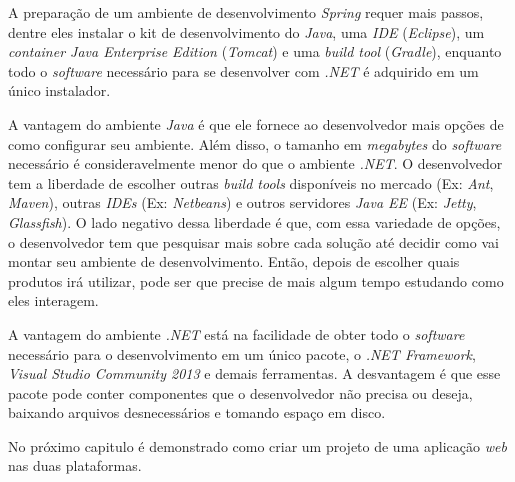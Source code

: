 A preparação de um ambiente de desenvolvimento \textit{Spring} requer mais passos, dentre eles instalar o kit de desenvolvimento do \textit{Java}, uma \textit{IDE} (\textit{Eclipse}), um \textit{container Java Enterprise Edition} (\textit{Tomcat}) e uma \textit{build tool} (\textit{Gradle}), enquanto  todo o \textit{software} necessário para se desenvolver com \textit{.NET} é adquirido em um único instalador.

A vantagem do ambiente \textit{Java} é que ele fornece ao desenvolvedor mais opções de como configurar seu ambiente. Além disso, o tamanho em \textit{megabytes} do \textit{software} necessário é consideravelmente menor do que o ambiente \textit{.NET}. O desenvolvedor tem a liberdade de escolher outras \textit{build tools} disponíveis no mercado (Ex: \textit{Ant}, \textit{Maven}), outras \textit{IDEs} (Ex: \textit{Netbeans}) e outros servidores \textit{Java EE} (Ex: \textit{Jetty}, \textit{Glassfish}). O lado negativo dessa liberdade é que, com  essa variedade de opções, o desenvolvedor tem que pesquisar mais sobre cada solução até decidir como vai montar seu ambiente de desenvolvimento. Então, depois de escolher quais produtos irá utilizar, pode ser que precise de mais algum tempo estudando como eles interagem.

A vantagem do ambiente \textit{.NET} está na facilidade de obter todo o \textit{software} necessário para o desenvolvimento em um único pacote, o \textit{.NET Framework}, \textit{Visual Studio Community 2013} e demais ferramentas. A desvantagem é que esse pacote pode conter componentes que o desenvolvedor não precisa ou deseja, baixando arquivos desnecessários e tomando espaço em disco.

No próximo capitulo é demonstrado como criar um projeto de uma aplicação \textit{web} nas duas plataformas.